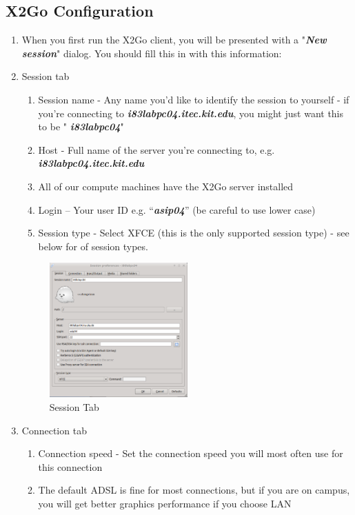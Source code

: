 \subsection{X2Go Configuration}
\begin{enumerate}[resume]
	\item When you first run the X2Go client, you will be presented with a "\emph{\textbf{New session}}" dialog. You should fill this in with this information:
	\item Session tab
	\begin{enumerate}[label*=\arabic*.]
		\item Session name - Any name you'd like to identify the session to yourself - if you're connecting to \emph{\textbf{i83labpc04.itec.kit.edu}}, you might just want this to be " \emph{\textbf{i83labpc04}}" 
		\item Host - Full name of the server you're connecting to, e.g. 
		\emph{\textbf{i83labpc04.itec.kit.edu}}
		\item All of our compute machines have the X2Go server installed
		\item Login -- Your user ID e.g. ``\emph{\textbf{asip04}}'' (be careful to use lower case)
		\item Session type - Select XFCE (this is the only supported session type) - see below for of session types.
	\end{enumerate}
\begin{figure}[!htb]
	\centering
	\includegraphics[width=0.5\textwidth]{src/images/image1.png}
	\caption{Session Tab}
	\label{fig:fig1}
\end{figure}
	\item Connection tab
	\begin{enumerate}[label*=\arabic*.]
		\item Connection speed - Set the connection speed you will most often use for this connection 
		\item The default ADSL is fine for most connections, but if you are on campus, you will get better graphics performance if you choose LAN

\end{enumerate}
\end{enumerate}
